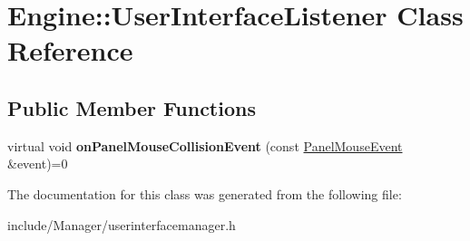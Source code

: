 \hypertarget{classEngine_1_1UserInterfaceListener}{}\section{Engine\+:\+:User\+Interface\+Listener Class Reference}
\label{classEngine_1_1UserInterfaceListener}
\subsection*{Public Member Functions}
\begin{DoxyCompactItemize}
\item 
\hypertarget{classEngine_1_1UserInterfaceListener_aad5473e99d8d3ea417fcbfa155d124cd}{}virtual void {\bfseries on\+Panel\+Mouse\+Collision\+Event} (const \hyperlink{classEngine_1_1PanelMouseEvent}{Panel\+Mouse\+Event} \&event)=0\label{classEngine_1_1UserInterfaceListener_aad5473e99d8d3ea417fcbfa155d124cd}

\end{DoxyCompactItemize}


The documentation for this class was generated from the following file\+:\begin{DoxyCompactItemize}
\item 
include/\+Manager/userinterfacemanager.\+h\end{DoxyCompactItemize}
